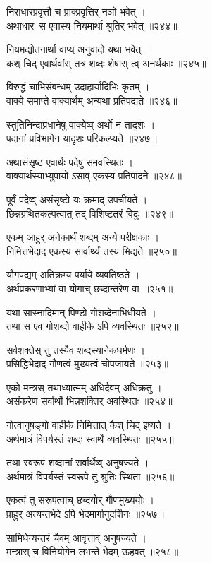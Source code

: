 निराधारप्रवृत्तौ च प्राक्प्रवृत्तिर् नञो भवेत् ।\\अथाधारः स एवास्य नियमार्था श्रुतिर् भवेत् ॥२४४॥

नियमद्योतनार्था वाप्य् अनुवादो यथा भवेत् ।\\कश् चिद् एवार्थवांस् तत्र शब्दः शेषास् त्व् अनर्थकाः ॥२४५॥

विरुद्धं चाभिसंबन्धम् उदाहार्यादिभिः कृतम् ।\\वाक्ये समाप्ते वाक्यार्थम् अन्यथा प्रतिपद्यते ॥२४६॥

स्तुतिनिन्दाप्रधानेषु वाक्येष्व् अर्थो न तादृशः ।\\पदानां प्रविभागेन यादृशः परिकल्प्यते ॥२४७॥

अथासंसृष्ट एवार्थः पदेषु समवस्थितः ।\\वाक्यार्थस्याभ्युपायो ऽसाव् एकस्य प्रतिपादने ॥२४८॥

पूर्वं पदेष्व् असंसृष्टो यः क्रमाद् उपचीयते ।\\छिन्नग्रथितकल्पत्वात् तद् विशिष्टतरं विदुः ॥२४९॥

एकम् आहुर् अनेकार्थं शब्दम् अन्ये परीक्षकाः ।\\निमित्तभेदाद् एकस्य सार्वार्थ्यं तस्य भिद्यते ॥२५०॥

यौगपद्यम् अतिक्रम्य पर्याये व्यवतिष्ठते ।\\अर्थप्रकरणाभ्यां वा योगाच् छब्दान्तरेण वा ॥२५१॥

यथा सास्नादिमान् पिण्डो गोशब्देनाभिधीयते ।\\तथा स एव गोशब्दो वाहीके ऽपि व्यवस्थितः ॥२५२॥

सर्वशक्तेस् तु तस्यैव शब्दस्यानेकधर्मणः ।\\प्रसिद्धिभेदाद् गौणत्वं मुख्यत्वं चोपजायते ॥२५३॥

एको मन्त्रस् तथाध्यात्मम् अधिदैवम् अधिक्रतु ।\\असंकरेण सर्वार्थो भिन्नशक्तिर् अवस्थितः ॥२५४॥

गोत्वानुषङ्गो वाहीके निमित्तात् कैश् चिद् इष्यते ।\\अर्थमात्रं विपर्यस्तं शब्दः स्वार्थे व्यवस्थितः ॥२५५॥

तथा स्वरूपं शब्दानां सर्वार्थेष्व् अनुषज्यते ।\\अर्थमात्रं विपर्यस्तं स्वरूपे तु श्रुतिः स्थिता ॥२५६॥

एकत्वं तु सरूपत्वाच् छब्दयोर् गौणमुख्ययोः ।\\प्राहुर् अत्यन्तभेदे ऽपि भेदमार्गानुदर्शिनः ॥२५७॥

सामिधेन्यन्तरं चैवम् आवृत्ताव् अनुषज्यते ।\\मन्त्रास् च विनियोगेन लभन्ते भेदम् ऊहवत् ॥२५८॥


